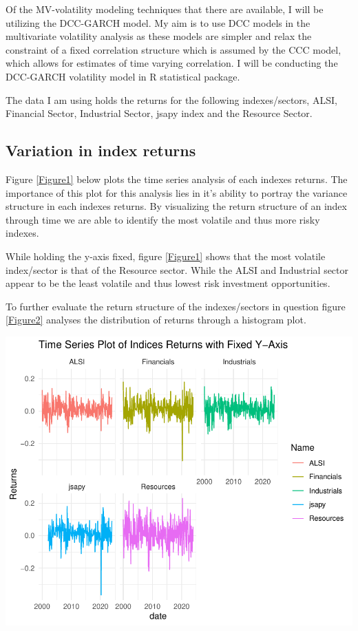 \documentclass[12pt,preprint, authoryear]{elsarticle}
\let\origfigure\figure
\let\endorigfigure\endfigure
\renewenvironment{figure}[1][2] {
    \expandafter\origfigure\expandafter[H]
} {
    \endorigfigure
}
\numberwithin{equation}{section}
\numberwithin{figure}{section}
\numberwithin{table}{section}
\begin{document}
Of the MV-volatility modeling techniques that there are available, I
will be utilizing the DCC-GARCH model. My aim is to use DCC models in
the multivariate volatility analysis as these models are simpler and
relax the constraint of a fixed correlation structure which is assumed
by the CCC model, which allows for estimates of time varying
correlation. I will be conducting the DCC-GARCH volatility model in R
statistical package.

The data I am using holds the returns for the following indexes/sectors,
ALSI, Financial Sector, Industrial Sector, jsapy index and the Resource
Sector.

\hypertarget{variation-in-index-returns}{%
\subsection{Variation in index
returns}\label{variation-in-index-returns}}

Figure \ref{Figure1} below plots the time series analysis of each
indexes returns. The importance of this plot for this analysis lies in
it's ability to portray the variance structure in each indexes returns.
By visualizing the return structure of an index through time we are able
to identify the most volatile and thus more risky indexes.

While holding the y-axis fixed, figure \ref{Figure1} shows that the most
volatile index/sector is that of the Resource sector. While the ALSI and
Industrial sector appear to be the least volatile and thus lowest risk
investment opportunities.

To further evaluate the return structure of the indexes/sectors in
question figure \ref{Figure2} analyses the distribution of returns
through a histogram plot.

\begin{figure}[H]

{\centering \includegraphics{DCC_GARCH_22582053_files/figure-latex/Figure1-1} 

}

\caption{Time Series Analysis of Returns \label{Figure1}}\label{fig:Figure1}
\end{figure}
\end{document}
